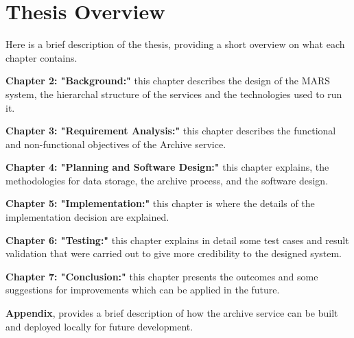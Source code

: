     \section{Thesis Overview} 
        Here is a brief description of the thesis, providing a short overview on what each
        chapter contains.
        
        \par
        \textbf{Chapter 2: "Background:"} this chapter describes the design
        of the MARS system, the hierarchal structure of the services and the technologies used to
        run it.

        \par
        \textbf{Chapter 3: "Requirement Analysis:"} this chapter describes the functional and
        non-functional objectives of the Archive service.

        \par
        \textbf{Chapter 4: "Planning and Software Design:"} this chapter explains, the 
        methodologies for data storage, the archive process, and the software design.

        \par
        \textbf{Chapter 5: "Implementation:"} this chapter is where the details of the 
        implementation decision are explained.

        \par
        \textbf{Chapter 6: "Testing:"} this chapter explains in detail 
        some test cases and result validation that were carried out to give more credibility to the designed system.

        \par
        \textbf{Chapter 7: "Conclusion:"} this chapter presents the outcomes and some 
        suggestions for improvements which can be applied in the future.
        
        \textbf{Appendix}, provides a brief description of how the archive service can be built and deployed locally for future development.

